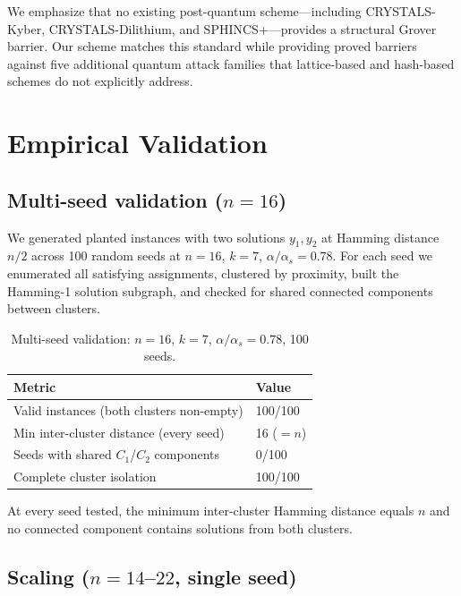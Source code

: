 \documentclass[11pt]{article}
\begin{document}
We emphasize that no existing post-quantum scheme---including CRYSTALS-Kyber, CRYSTALS-Dilithium, and SPHINCS+---provides a structural Grover barrier.  Our scheme matches this standard while providing proved barriers against five additional quantum attack families that lattice-based and hash-based schemes do not explicitly address.


\section{Empirical Validation}

\subsection{Multi-seed validation ($n = 16$)}

We generated planted instances with two solutions $y_1, y_2$ at Hamming distance $n/2$ across 100 random seeds at $n = 16$, $k = 7$, $\alpha/\alpha_s = 0.78$.  For each seed we enumerated all satisfying assignments, clustered by proximity, built the Hamming-1 solution subgraph, and checked for shared connected components between clusters.

\begin{table}[ht]
\centering
\caption{Multi-seed validation: $n = 16$, $k = 7$, $\alpha/\alpha_s = 0.78$, 100 seeds.}\label{tab:multiseed}
\begin{tabular}{@{}ll@{}}
\toprule
Metric & Value \\
\midrule
Valid instances (both clusters non-empty) & 100/100 \\
Min inter-cluster distance (every seed) & 16 ($= n$) \\
Seeds with shared $C_1$/$C_2$ components & 0/100 \\
Complete cluster isolation & 100/100 \\
\bottomrule
\end{tabular}
\end{table}

At every seed tested, the minimum inter-cluster Hamming distance equals $n$ and no connected component contains solutions from both clusters.


\subsection{Scaling ($n = 14$--$22$, single seed)}
\end{document}
